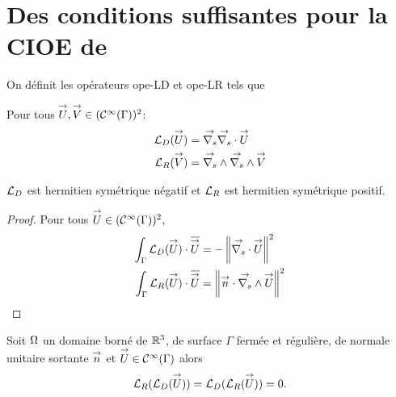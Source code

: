 \section[Des CSU pour la CIOE de Marceaux 2000]{Des conditions suffisantes pour la CIOE de \cite{marceaux_high-order_2000}}

  \begin{defn}
    On définit les opérateurs \gls{ope-LD} et \gls{ope-LR} tels que %

    Pour tous \(\vect U,\vect V \in (\mathcal{C}^\infty(\Gamma))^2\): 
    \begin{align*}
      \LD(\vect U) &= \vgrads \vdivs \vect U
      \\
      \LR(\vect V) &= \vrots \vrots \vect V
    \end{align*}
  \end{defn}

  \begin{prop}
    \(\LD\) est hermitien symétrique négatif et \(\LR\) est hermitien symétrique positif.
  \end{prop}

  \begin{proof}
    Pour tous \(\vect U \in (\mathcal{C}^\infty(\Gamma))^2\),
    \begin{align*}
      \int_\Gamma \LD(\vect U)\cdot \conj{\vect U} &= -\norm{\vdivs \vect U}^2
      \\
      \int_\Gamma \LR(\vect U)\cdot \conj{\vect U} &=\norm{\vn \cdot \vrots \vect U}^2
    \end{align*}
  \end{proof}

  \begin{prop}
    Soit \(\OO\) un domaine borné de \(\RR^3\), de surface \(\Gamma\) fermée et régulière, de normale unitaire sortante \(\vect n\) et \(\vect{U} \in \mathcal{C}^{\infty}(\Gamma)\) alors
    \begin{equation*}
        \LR(\LD(\vect U)) = \LD(\LR(\vect U)) = 0.
    \end{equation*}
  \end{prop}

